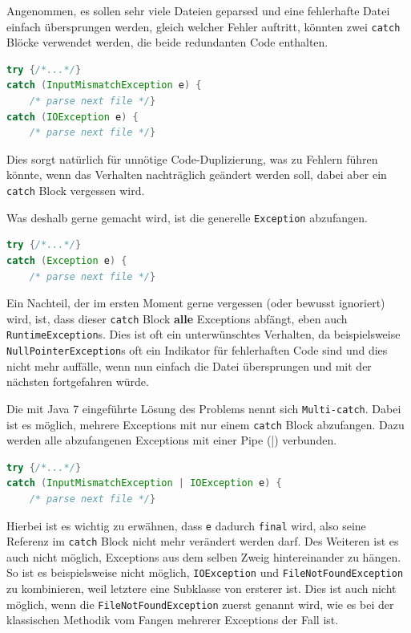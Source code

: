 \documentclass[times, 10pt,twocolumn]{article}
\begin{document}
Angenommen, es sollen sehr viele Dateien geparsed und eine fehlerhafte Datei einfach übersprungen werden, 
gleich welcher Fehler auftritt, könnten zwei \texttt{catch} Blöcke verwendet werden, die beide redundanten Code enthalten.
\begin{lstlisting}[language=java,breaklines=true]
try {/*...*/} 
catch (InputMismatchException e) {
	/* parse next file */}
catch (IOException e) {
	/* parse next file */}
\end{lstlisting} 
Dies sorgt natürlich für unnötige Code-Duplizierung, was zu Fehlern führen könnte, wenn das Verhalten nachträglich geändert 
werden soll, dabei aber ein \texttt{catch} Block vergessen wird.

Was deshalb gerne gemacht wird, ist die generelle \texttt{Exception} abzufangen.
\begin{lstlisting}[language=java,breaklines=true]
try {/*...*/} 
catch (Exception e) {
	/* parse next file */}
\end{lstlisting}
Ein Nachteil, der im ersten Moment gerne vergessen (oder bewusst ignoriert) wird, ist, dass dieser \texttt{catch} Block 
\textbf{alle} Exceptions abfängt, eben auch \texttt{RuntimeException}s. Dies ist oft ein unterwünschtes Verhalten, da 
beispielsweise \texttt{NullPointerException}s oft ein Indikator für fehlerhaften Code sind und dies nicht mehr auffälle,
wenn nun einfach die Datei übersprungen und mit der nächsten fortgefahren würde.

Die mit Java 7 eingeführte Lösung des Problems nennt sich \texttt{Multi-catch}. Dabei ist es möglich, mehrere Exceptions
mit nur einem \texttt{catch} Block abzufangen. Dazu werden alle abzufangenen Exceptions mit einer Pipe (|) verbunden.\cite{javainsel2}
\begin{lstlisting}[language=java,breaklines=true]
try {/*...*/} 
catch (InputMismatchException | IOException e) {
	/* parse next file */}
\end{lstlisting}
Hierbei ist es wichtig zu erwähnen, dass \texttt{e} dadurch \texttt{final} wird, also seine Referenz im \texttt{catch} Block 
nicht mehr verändert werden darf. Des Weiteren ist es auch nicht möglich, Exceptions aus dem selben Zweig hintereinander
zu hängen. So ist es beispielsweise nicht möglich, \texttt{IOException} und \texttt{FileNotFoundException} zu kombinieren,
weil letztere eine Subklasse von ersterer ist. Dies ist auch nicht möglich, wenn die \texttt{FileNotFoundException} zuerst
genannt wird, wie es bei der klassischen Methodik vom Fangen mehrerer Exceptions der Fall ist.
\end{document}
